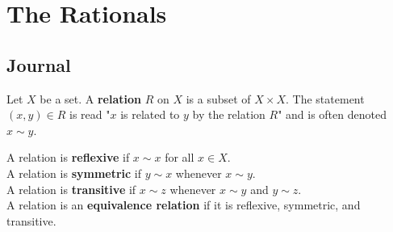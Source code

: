 \documentclass[../main.tex]{subfiles}
\begin{document}
\chapter{The Rationals}\label{sct:2}
\section{Journal}
\begin{definition}\label{dfn:2.1}
    Let $X$ be a set. A \textbf{relation} $R$ on $X$ is a subset of $X\times X$. The statement $(x,y)\in R$ is read "$x$ is related to $y$ by the relation $R$" and is often denoted $x\sim y$.\par\medskip
    \noindent A relation is \textbf{reflexive} if $x\sim x$ for all $x\in X$.\\
    A relation is \textbf{symmetric} if $y\sim x$ whenever $x\sim y$.\\
    A relation is \textbf{transitive} if $x\sim z$ whenever $x\sim y$ and $y\sim z$.\\
    A relation is an \textbf{equivalence relation} if it is reflexive, symmetric, and transitive.
\end{definition}
\smallskip
\end{document}
